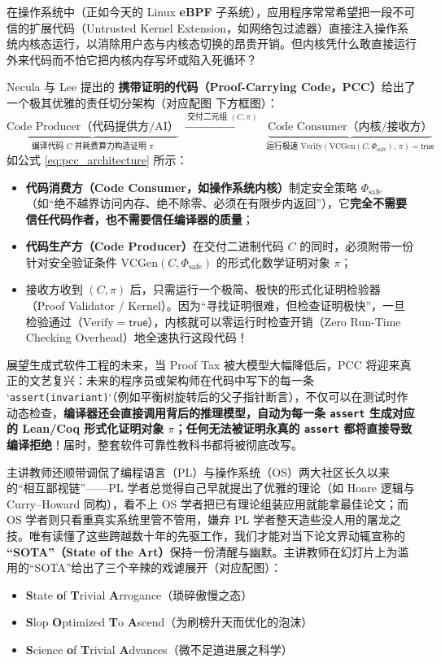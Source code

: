 \documentclass[a4paper]{article}
\begin{document}
在操作系统中（正如今天的 Linux \textbf{eBPF} 子系统），应用程序常常希望把一段不可信的扩展代码（Untrusted Kernel Extension，如网络包过滤器）直接注入操作系统内核态运行，以消除用户态与内核态切换的昂贵开销。但内核凭什么敢直接运行外来代码而不怕它把内核内存写坏或陷入死循环？

Necula 与 Lee 提出的 \textbf{携带证明的代码（Proof-Carrying Code，PCC）}给出了一个极其优雅的责任切分架构（对应配图 下方框图）：
\begin{equation}
\underbrace{\text{Code Producer（代码提供方/AI）}}_{\text{编译代码 } C \text{ 并耗费算力构造证明 } \pi}
\;\xrightarrow{\;\text{交付二元组 }(C, \pi)\;}\;
\underbrace{\text{Code Consumer（内核/接收方）}}_{\text{运行极速 }\mathrm{Verify}(\mathrm{VCGen}(C, \Phi_{\text{safe}}),\, \pi) = \mathsf{true}}
\label{eq:pcc_architecture}
\end{equation}
如公式 \eqref{eq:pcc_architecture} 所示：
\begin{itemize}
    \item \textbf{代码消费方（Code Consumer，如操作系统内核）}制定安全策略 $\Phi_{\text{safe}}$（如“绝不越界访问内存、绝不除零、必须在有限步内返回”），它\textbf{完全不需要信任代码作者，也不需要信任编译器的质量}；
    \item \textbf{代码生产方（Code Producer）}在交付二进制代码 $C$ 的同时，必须附带一份针对安全验证条件 $\mathrm{VCGen}(C, \Phi_{\text{safe}})$ 的形式化数学证明对象 $\pi$；
    \item 接收方收到 $(C, \pi)$ 后，只需运行一个极简、极快的形式化证明检验器（Proof Validator / Kernel）。因为“寻找证明很难，但检查证明极快”，一旦检验通过（$\mathrm{Verify} = \mathsf{true}$），内核就可以零运行时检查开销（Zero Run-Time Checking Overhead）地全速执行这段代码！
\end{itemize}

展望生成式软件工程的未来，当 Proof Tax 被大模型大幅降低后，PCC 将迎来真正的文艺复兴：未来的程序员或架构师在代码中写下的每一条 `\texttt{assert(invariant)}`（例如平衡树旋转后的父子指针断言），不仅可以在测试时作动态检查，\textbf{编译器还会直接调用背后的推理模型，自动为每一条 \texttt{assert} 生成对应的 Lean/Coq 形式化证明对象 $\pi$；任何无法被证明永真的 \texttt{assert} 都将直接导致编译拒绝}！届时，整套软件可靠性教科书都将被彻底改写。

主讲教师还顺带调侃了编程语言（PL）与操作系统（OS）两大社区长久以来的“相互鄙视链”——PL 学者总觉得自己早就提出了优雅的理论（如 Hoare 逻辑与 Curry--Howard 同构），看不上 OS 学者把已有理论组装应用就能拿最佳论文；而 OS 学者则只看重真实系统里管不管用，嫌弃 PL 学者整天造些没人用的屠龙之技。唯有读懂了这些跨越数十年的先驱工作，我们才能对当下论文界动辄宣称的 \textbf{“SOTA”（State of the Art）}保持一份清醒与幽默。主讲教师在幻灯片上为滥用的“SOTA”给出了三个辛辣的戏谑展开（对应配图）：
\begin{itemize}
    \item \textbf{S}tate \textbf{o}f \textbf{T}rivial \textbf{A}rrogance（琐碎傲慢之态）
    \item \textbf{S}lop \textbf{O}ptimized \textbf{T}o \textbf{A}scend（为刷榜升天而优化的泡沫）
    \item \textbf{S}cience \textbf{o}f \textbf{T}rivial \textbf{A}dvances（微不足道进展之科学）
\end{itemize}
\end{document}
